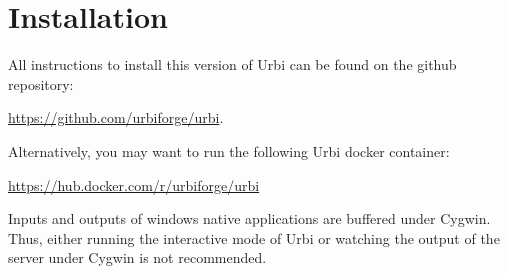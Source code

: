 
\chapter{Installation}
\label{sec:installation}

All instructions to install this version of Urbi can be found on the github repository:

\url{https://github.com/urbiforge/urbi}.

Alternatively, you may want to run the following Urbi docker container:

\url{https://hub.docker.com/r/urbiforge/urbi}

\begin{cygwin}
Inputs and outputs of windows native applications are buffered under Cygwin.
Thus, either running the interactive mode of Urbi or watching the output of the
server under Cygwin is not recommended.
\end{cygwin}

